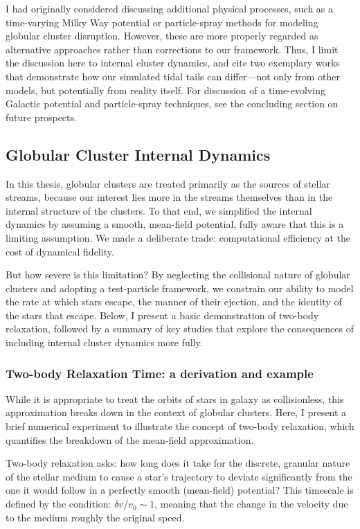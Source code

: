     I had originally considered discussing additional physical processes, such as a time-varying Milky Way potential or particle-spray methods for modeling globular cluster disruption. However, these are more properly regarded as alternative approaches rather than corrections to our framework. Thus, I limit the discussion here to internal cluster dynamics, and cite two exemplary works that demonstrate how our simulated tidal tails can differ—not only from other models, but potentially from reality itself. For discussion of a time-evolving Galactic potential and particle-spray techniques, see the concluding section on future prospects.
    \subsection{Globular Cluster Internal Dynamics} \label{sec:collisionalDynamics}
        In this thesis, globular clusters are treated primarily as the sources of stellar streams, because our interest lies more in the streams themselves than in the internal structure of the clusters. To that end, we simplified the internal dynamics by assuming a smooth, mean-field potential, fully aware that this is a limiting assumption. We made a deliberate trade: computational efficiency at the cost of dynamical fidelity.

        But how severe is this limitation? By neglecting the collisional nature of globular clusters and adopting a test-particle framework, we constrain our ability to model the rate at which stars escape, the manner of their ejection, and the identity of the stars that escape. Below, I present a basic demonstration of two-body relaxation, followed by a summary of key studies that explore the consequences of including internal cluster dynamics more fully.
        \subsubsection{Two-body Relaxation Time: a derivation and example} \label{sec:twoBodyRelaxation}
            While it is appropriate to treat the orbits of stars in galaxy as collisionless, this approximation breaks down in the context of globular clusters. Here, I present a brief numerical experiment to illustrate the concept of two-body relaxation, which quantifies the breakdown of the mean-field approximation.

            Two-body relaxation asks: how long does it take for the discrete, granular nature of the stellar medium to cause a star's trajectory to deviate significantly from the one it would follow in a perfectly smooth (mean-field) potential? This timescale is defined by the condition: $\delta v / v_0 \sim 1$, meaning that the change in the velocity due to the medium roughly the original speed.

